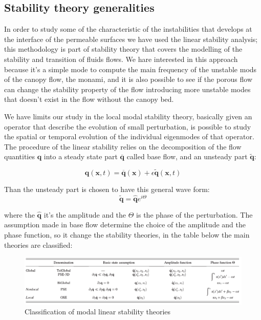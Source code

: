 \citet{finnigan2000turbulence} \citet{jimenez2001turbulent}

\subsection{Stability theory generalities}

In order to study some of the characteristic of the instabilities that develops at the interface of the permeable surfaces we have used the linear stability analysis; this methodology is part of stability theory that covers the modelling of the stability and transition of fluids flows.
We hare interested in this approach because it's a simple mode to compute the main frequency of the unstable mods of the canopy flow, the monami, and it is also possible to see if the porous flow can change the stability property of the flow introducing more unstable modes that doesn't exist in the flow without the canopy bed. 
 
We have limits our study in the local modal stability theory, basically given an operator that describe the evolution of small perturbation, is possible to study the spatial or temporal evolution of the individual eigenmodes of that operator.
The procedure of the linear stability relies on the decomposition of the flow quantities $\mathbf{q}$ into a steady state part $\overline{\mathbf{q}}$ called base flow, and an unsteady part $\widetilde{\mathbf{q}}$:

$$ \mathbf{q} (\mathbf{x},t)= \overline{\mathbf{q}} (\mathbf{x}) + \epsilon \widetilde{\mathbf{q}} (\mathbf{x},t) $$

Than the unsteady part is chosen to have this general wave form:
$$  \widetilde{\mathbf{q}} =  \widehat{\mathbf{q}} e^{i\Theta} $$

where the $\widehat{\mathbf{q}}$ it's the amplitude and the $\Theta$ is the phase of the perturbation.
The assumption made in base flow determine the choice of the amplitude and the phase function, so it change the stability theories, in the table below the main theories are classified:

\begin{figure}[h]
	\centering
	\includegraphics[width=1\linewidth]{chapter_1/table}
	\caption{Classification of modal linear stability theories}
	\label{fig:table}
\end{figure}

